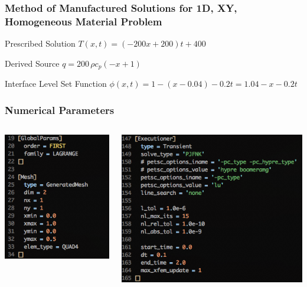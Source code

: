 \documentclass[]{beamer}
\begin{document}
\begin{frame}[t]\frametitle{Method of Manufactured Solutions for 1D, XY, Homogeneous Material Problem}
\begin{block}{Prescribed Solution}
    $T(x,t) = (-200x+200)t + 400$
  \end{block}
  
  \begin{block}{Derived Source}
  $q = 200\,\rho c_p \left(-x+1\right)$
  \end{block}
  
  \begin{block}{Interface Level Set Function}
    $\phi(x,t) = 1 - (x - 0.04) - 0.2t = 1.04 - x - 0.2t$
  \end{block}
\end{frame}

\begin{frame}\frametitle{Numerical Parameters}
  	\begin{columns}
			\begin{center}
			\includegraphics[scale=0.4]{figures/1D_xy_h1m/Screen-GlobalParams-1Dxyh1m}
			\end{center}
			\begin{center}
			\includegraphics[scale=0.4]{figures/1D_xy_h1m/Screen-Executioner-1Dxyh1m}

\end{center}
\end{columns}
\end{frame}
\end{document}
